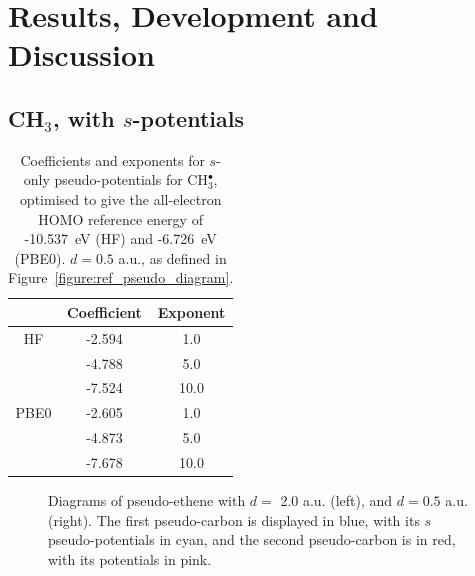 \documentclass[journal=jctcce,manuscript=article]{achemso}
\begin{document}
\section{Results, Development and Discussion}
\subsection{CH\(_{3}\), with \(s\)-potentials}

\begin{table}[ht]
\caption{Coefficients and exponents for \(s\)-only pseudo-potentials for CH\(^{\bullet}_{3}\), optimised to give 
the all-electron HOMO reference energy of  -10.537~eV (HF) and -6.726~eV (PBE0). 
\(d = 0.5\) a.u., as defined in Figure~\ref{figure:ref_pseudo_diagram}.}
\begin{tabular}{c c c}
\hline
 & Coefficient & Exponent \\ 
\hline
HF & -2.594 & 1.0 \\
 & -4.788 & 5.0 \\
 & -7.524 & 10.0 \\
\hline
PBE0 & -2.605 & 1.0 \\
 & -4.873 & 5.0 \\
 & -7.678 & 10.0 \\
\hline
\end{tabular}
\label{table:ch3_s_potentials}
\end{table}

\begin{figure}
%
\caption{Diagrams of pseudo-ethene with \(d =\) 2.0 a.u. (left), and \(d = 0.5\) a.u. (right). The first pseudo-carbon is displayed in blue, with its \(s\) pseudo-potentials in cyan, and the second pseudo-carbon is in red, with its potentials in pink.}
\label{fig:long_r_ethene}
\end{figure}
\end{document}
